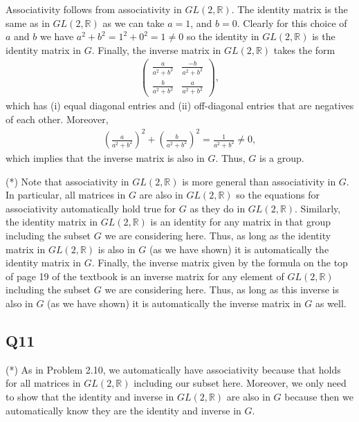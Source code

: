 \documentclass[12pt]{article}
\def\R{{\mathbb R}}        %
\numberwithin{theorem}{section}
\numberwithin{equation}{section}
\numberwithin{remark}{section}
\numberwithin{definition}{section}
\numberwithin{theorem}{section}
\numberwithin{lemma}{section}
\numberwithin{example}{section}
\begin{document}
Associativity follows from associativity in $GL(2,\R)$. The identity matrix is the same as in $GL(2,\R)$ as we can take $a=1$, and $b=0$. Clearly for this choice of $a$ and $b$ we have $a^2+b^2=1^2+0^2=1\neq0$ so the identity in $GL(2,\R)$ is the identity matrix in $G$. Finally, the inverse matrix in $GL(2,\R)$ takes the form
\begin{align*}
	\begin{pmatrix}\frac{a}{a^2+b^2} & \frac{-b}{a^2+b^2} \\ \frac{b}{a^2+b^2} & \frac{a}{a^2+b^2} \end{pmatrix},
\end{align*}
which has (i) equal diagonal entries and (ii) off-diagonal entries that are negatives of each other. Moreover, 
\begin{align*}
	\left(\frac{a}{a^2+b^2}\right)^2+\left(\frac{b}{a^2+b^2}\right)^2=\frac{1}{a^2+b^2}\neq0,
\end{align*}
which implies that the inverse matrix is also in $G$. Thus, $G$ is a group. 

\vspace{\baselineskip}

\noindent (*) Note that associativity in $GL(2,\R)$ is more general than associativity in $G$. In particular, all matrices in $G$ are also in $GL(2,\R)$ so the equations for associativity automatically hold true for $G$ as they do in $GL(2,\R)$. Similarly, the identity matrix in $GL(2,\R)$ is an identity for any matrix in that group including the subset $G$ we are considering here. Thus, as long as the identity matrix in $GL(2,\R)$ is also in $G$ (as we have shown) it is automatically the identity matrix in $G$. Finally, the inverse matrix given by the formula on the top of page 19 of the textbook is an inverse matrix for any element of $GL(2,\R)$ including the subset $G$ we are considering here. Thus, as long as this inverse is also in $G$ (as we have shown) it is automatically the inverse matrix in $G$ as well. 



\subsection{Q11}



\vspace{\baselineskip}

\noindent (*) As in Problem 2.10, we automatically have associativity because that holds for all matrices in $GL(2,\R)$ including our subset here. Moreover, we only need to show that the identity and inverse in $GL(2,\R)$ are also in $G$ because then we automatically know they are the identity and inverse in $G$. 
\end{document}
